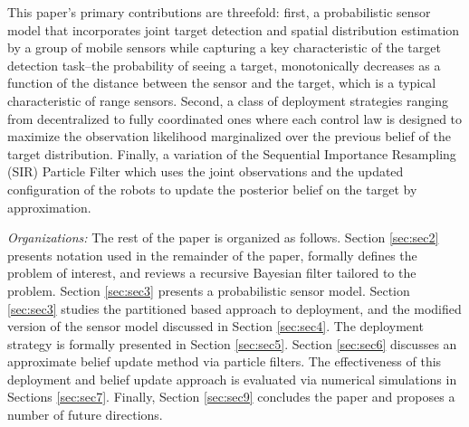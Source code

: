 \documentclass[letterpaper, 10 pt, conference]{ieeeconf}
\newcommand{\Ram}[1]{{\normalsize{\textbf{({\color{green}Ram:\ }#1)}}}}
\newcommand{\HJP}[1]{{\normalsize{\textbf{({\color{blue}Hyongju:\ }#1)}}}}
\begin{document}
This paper's primary contributions are threefold:
first, a probabilistic sensor model that incorporates joint target detection and spatial distribution estimation by a group of mobile sensors while capturing a key characteristic of the target detection task--the probability of seeing a target, monotonically decreases as a function of the distance between the sensor and the target, which is a typical characteristic of range sensors.
Second, a class of deployment strategies ranging from decentralized to fully coordinated ones where each control law is designed to maximize the observation likelihood marginalized over the previous belief of the target distribution.
Finally, a variation of the Sequential Importance Resampling (SIR) Particle Filter which uses the joint observations and the updated configuration of the robots to update the posterior belief on the target by approximation.

\textit{Organizations:}
The rest of the paper is organized as follows. 
Section \ref{sec:sec2} presents notation used in the remainder of the paper, formally defines the problem of interest, and reviews a recursive Bayesian filter tailored to the problem.
Section \ref{sec:sec3} presents a probabilistic sensor model.
Section \ref{sec:sec3} studies the partitioned based approach to deployment, and the modified version of the sensor model discussed in Section \ref{sec:sec4}. 
The deployment strategy is formally presented in Section \ref{sec:sec5}. 
Section \ref{sec:sec6} discusses an approximate belief update method via particle filters.
The effectiveness of this deployment and belief update approach is evaluated via numerical simulations in Sections \ref{sec:sec7}.
Finally, Section \ref{sec:sec9} concludes the paper and proposes a number of future directions.





\end{document}
